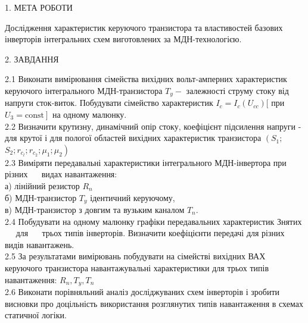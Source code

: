 \documentclass[a4paper,14pt]{extreport}
\begin{document}
\begin{center}1. МЕТА РОБОТИ\\ \end{center}

Дослідження характеристик керуючого транзистора та властивостей
базових інверторів інтегральних схем виготовлених за МДН-технологією.

\begin{center}2. ЗАВДАННЯ\\ \end{center}

2.1 Виконати вимірювання сімейства вихідних вольт-амперних характеристик керуючого інтегрального МДН-транзистора $T_{y}-$ залежності струму стоку від напруги сток-виток. Побудувати сімейство характеристик $I_{c}=I_{c}\left(U_{c c}\right)[$ при $\left.U_{3}=\mathrm{const}\right]$ на одному малюнку.\\

2.2 Визначити крутизну, динамічний опір стоку, коефіцієнт підсилення напруги
- для крутої і для пологої областей вихідних характеристик транзистора $\left(S_{1} ;\right.$ $\left.S_{2} ; r_{c_l} ; r_{c_2} ; \mu_{1} ; \mu_{2}\right)$\\

2.3 Виміряти передавальні характеристики інтегрального МДН-інвертора при різних $\quad$ видах навантаження: \\

\hspace{1cm} а) лінійний резистор $R_{n}$\\

\hspace{1cm} б) МДН-транзистор $T_{y}$ ідентичний керуючому,\\

\hspace{1cm} в) МДН-транзистор з довгим та вузьким каналом $T_{n} .$\\

2.4 Побудувати на одному малюнку графіки передавальних характеристик Знятих $\quad$ для $\quad$ трьох типів інверторів. Визначити коефіцієнти передачі для різних видів навантажень.\\

2.5 За результатами вимірювань побудувати на сімействі вихідних ВАХ керуючого транзистора навантажувальні характеристики для трьох типів навантаження: $R_{n}, T_{y}, T_{n}$\\


2.6 Виконати порівняльний аналіз досліджуваних схем інверторів і зробити висновки про доцільність використання розглянутих типів навантаження в схемах статичної логіки.\\
\end{document}
